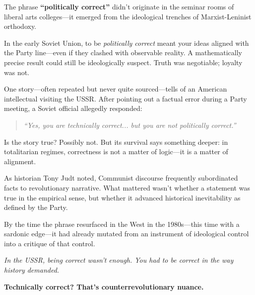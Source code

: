 \begin{tcolorbox}[title=Sidebar: “Politically Correct” — A Truth Too Convenient?, colback=black!5!white, colframe=black, fonttitle=\bfseries\scshape, coltitle=black]

    The phrase \textbf{“politically correct”} didn’t originate in the seminar rooms of liberal arts colleges—it emerged from the ideological trenches of Marxist-Leninist orthodoxy.  

    \medskip
    
    In the early Soviet Union, to be \textit{politically correct} meant your ideas aligned with the Party line—even if they clashed with observable reality. A mathematically precise result could still be ideologically suspect. Truth was negotiable; loyalty was not.
    \medskip
    
    One story—often repeated but never quite sourced—tells of an American intellectual visiting the USSR. After pointing out a factual error during a Party meeting, a Soviet official allegedly responded:  

    \begin{quote}
    \textit{“Yes, you are technically correct... but you are not politically correct.”}
    \end{quote}
    
    Is the story true? Possibly not. But its survival says something deeper: in totalitarian regimes, correctness is not a matter of logic—it is a matter of alignment.  

    \medskip
    
    As historian Tony Judt noted, Communist discourse frequently subordinated facts to revolutionary narrative. What mattered wasn’t whether a statement was true in the empirical sense, but whether it advanced historical inevitability as defined by the Party.

    \medskip
    
    By the time the phrase resurfaced in the West in the 1980s—this time with a sardonic edge—it had already mutated from an instrument of ideological control into a critique of that control.

    \medskip
    
    \textit{In the USSR, being correct wasn’t enough. You had to be correct in the way history demanded.}

    \medskip
    
    \textbf{Technically correct? That’s counterrevolutionary nuance.}
    
\end{tcolorbox}

